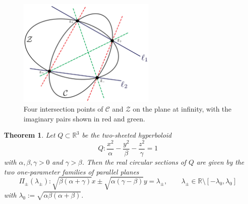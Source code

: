 \documentclass[10pt, a4paper]{article}
\theoremstyle{BoldTopSpacing}
\newtheorem{theorem}{Theorem}[section]
\theoremstyle{BoldTopSpacing}
\theoremstyle{BoldTopSpacing}
\theoremstyle{BoldTopBottomSpacing}
\theoremstyle{BoldTopSpacing}
\theoremstyle{BoldTopBottomSpacing}
\theoremstyle{remark}
\begin{document}
\begin{figure}[H]
    \centering
    \includegraphics[width=0.6\textwidth]{conics-through-four-points.png}
    \caption{Four intersection points of $\mathcal{C}$ and $\mathcal{Z}$ on the plane at infinity, with the imaginary pairs shown in red and green.}
    \label{fig:conics-through-four-points}
\end{figure}

\begin{theorem}
\label{thm:circular-sections-hyperboloid}
Let $Q \subset \mathbb{R}^3$ be the two-sheeted hyperboloid
\[
    Q : \frac{x^2}{\alpha} - \frac{y^2}{\beta} - \frac{z^2}{\gamma} = 1
\]
with $\alpha, \beta, \gamma > 0$ and $\gamma > \beta$. Then the real circular sections of $Q$ are given by the two one-parameter families of parallel planes
\begin{equation}
\label{eq:planes-two-sheeted}
\Pi_{\pm}(\lambda_{\pm}) :\sqrt{\beta (\alpha + \gamma)} x \pm \sqrt{\alpha (\gamma - \beta)} y = \lambda_{\pm}, \quad \quad \lambda_{\pm} \in \mathbb{R} \setminus \left[-\lambda_{0}, \lambda_{0} \right]
\end{equation}
with $\lambda_{0} := \sqrt{\alpha \beta (\alpha+\beta)}$.
\end{theorem}
\end{document}
